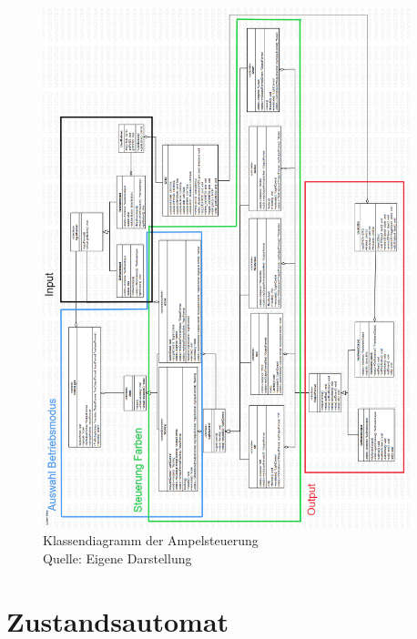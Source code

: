 \begin{figure}[H] 
	\centering
	\includegraphics[width=0.95\textwidth]{images/08.png}
	\caption{Klassendiagramm der Ampelsteuerung \protect \\ Quelle: Eigene Darstellung }
	\label{fig:grafik8}
\end{figure}

\section{Zustandsautomat}

